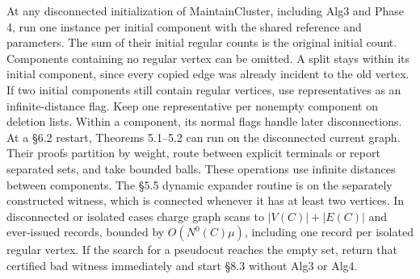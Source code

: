 \documentclass[11pt]{article}
\begin{document}
At any disconnected initialization of MaintainCluster, including Alg3 and Phase 4, run one instance per initial component with the shared reference and parameters. The sum of their initial regular counts is the original initial count. Components containing no regular vertex can be omitted. A split stays within its initial component, since every copied edge was already incident to the old vertex. If two initial components still contain regular vertices, use representatives as an infinite-distance flag. Keep one representative per nonempty component on deletion lists. Within a component, its normal flags handle later disconnections. At a §6.2 restart, Theorems 5.1--5.2 can run on the disconnected current graph. Their proofs partition by weight, route between explicit terminals or report separated sets, and take bounded balls. These operations use infinite distances between components. The §5.5 dynamic expander routine is on the separately constructed witness, which is connected whenever it has at least two vertices. In disconnected or isolated cases charge graph scans to \(|V(C)|+|E(C)|\) and ever-issued records, bounded by \(O(N^0(C)\mu)\), including one record per isolated regular vertex. If the search for a pseudocut reaches the empty set, return that certified bad witness immediately and start §8.3 without Alg3 or Alg4.
\end{document}
